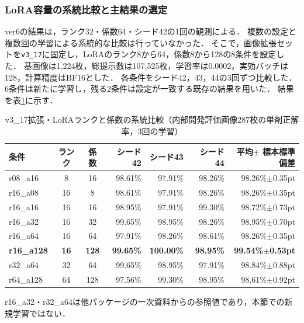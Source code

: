 \documentclass[uplatex,dvipdfmx]{jsarticle}
\begin{document}
\subsubsection{LoRA容量の系統比較と主結果の選定}\label{sec:r16a128_sweep}

ver6の結果は，ランク32・係数64・シード42の1回の観測による．
複数の設定と複数回の学習による系統的な比較は行っていなかった．
そこで，画像拡張セットを\texttt{v3\_17}に固定し，LoRAのランク8から64，係数8から128の8条件を設定した．
基画像は1,224枚，総提示数は107,525枚，学習率は0.0002，実効バッチは128，計算精度はBF16とした．
各条件をシード42，43，44の3回ずつ比較した．6条件は新たに学習し，残る2条件は設定が一致する既存の結果を用いた．
結果を表\ref{tab:r16a128_sweep}に示す．

\begin{table}[htbp]
  \centering
  \caption{v3\_17拡張・LoRAランクと係数の系統比較（内部開発評価画像287枚の単剤正解率，3回の学習）}
  \label{tab:r16a128_sweep}
  \small
  \setlength{\tabcolsep}{3pt}
  \begin{tabular}{|l|c|c|r|r|r|r|}
    \hline
    条件 & ランク & 係数 & シード42 & シード43 & シード44 & \shortstack{平均$\pm$\\標本標準偏差} \\ \hline
    r08\_a16 & 8 & 16 & 98.61\% & 97.91\% & 98.26\% & 98.26\%$\pm$0.35pt \\ \hline
    r16\_a08 & 16 & 8 & 98.61\% & 97.91\% & 98.26\% & 98.26\%$\pm$0.35pt \\ \hline
    r16\_a16 & 16 & 16 & 98.95\% & 97.91\% & 99.30\% & 98.72\%$\pm$0.73pt \\ \hline
    r16\_a32 & 16 & 32 & 99.65\% & 98.95\% & 98.26\% & 98.95\%$\pm$0.70pt \\ \hline
    r16\_a64 & 16 & 64 & 97.91\% & 98.26\% & 98.61\% & 98.26\%$\pm$0.35pt \\ \hline
    \textbf{r16\_a128} & \textbf{16} & \textbf{128} & \textbf{99.65\%} & \textbf{100.00\%} & \textbf{98.95\%} & \textbf{99.54\%$\pm$0.53pt} \\ \hline
    r32\_a64 & 32 & 64 & 99.65\% & 98.95\% & 97.91\% & 98.84\%$\pm$0.88pt \\ \hline
    r64\_a128 & 64 & 128 & 97.56\% & 99.30\% & 98.95\% & 98.61\%$\pm$0.92pt \\ \hline
  \end{tabular}

  \vspace{1mm}
  {\small r16\_a32・r32\_a64は他パッケージの一次資料からの参照値であり，本節での新規学習ではない．}
\end{table}
\end{document}

